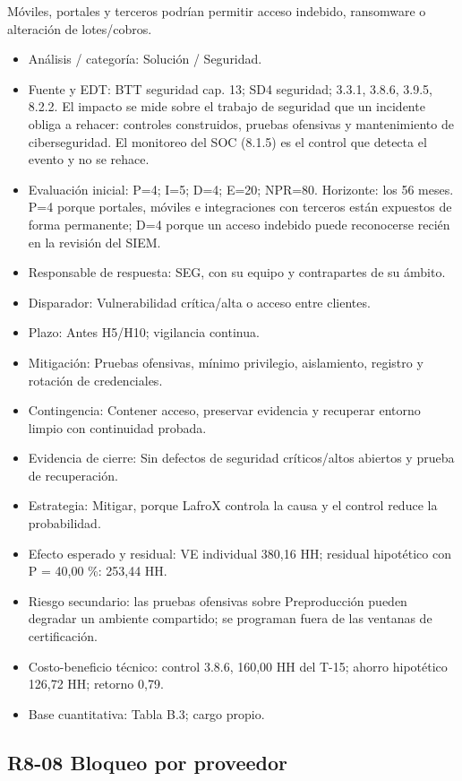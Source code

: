 Móviles, portales y terceros podrían permitir acceso indebido, ransomware o alteración de lotes/cobros.

\begin{itemize}[leftmargin=*,itemsep=3pt]
\item Análisis / categoría: Solución / Seguridad.
\item Fuente y EDT: BTT seguridad cap. 13; SD4 seguridad; 3.3.1, 3.8.6, 3.9.5, 8.2.2. El impacto se mide sobre el trabajo de seguridad que un incidente obliga a rehacer: controles construidos, pruebas ofensivas y mantenimiento de ciberseguridad. El monitoreo del SOC (8.1.5) es el control que detecta el evento y no se rehace.
\item Evaluación inicial: P=4; I=5; D=4; E=20; NPR=80. Horizonte: los 56 meses. P=4 porque portales, móviles e integraciones con terceros están expuestos de forma permanente; D=4 porque un acceso indebido puede reconocerse recién en la revisión del SIEM.
\item Responsable de respuesta: SEG, con su equipo y contrapartes de su ámbito.
\item Disparador: Vulnerabilidad crítica/alta o acceso entre clientes.
\item Plazo: Antes H5/H10; vigilancia continua.
\item Mitigación: Pruebas ofensivas, mínimo privilegio, aislamiento, registro y rotación de credenciales.
\item Contingencia: Contener acceso, preservar evidencia y recuperar entorno limpio con continuidad probada.
\item Evidencia de cierre: Sin defectos de seguridad críticos/altos abiertos y prueba de recuperación.
\item Estrategia: Mitigar, porque LafroX controla la causa y el control reduce la probabilidad.
\item Efecto esperado y residual: VE individual 380,16 HH; residual hipotético con P = 40,00 \%: 253,44 HH.
\item Riesgo secundario: las pruebas ofensivas sobre Preproducción pueden degradar un ambiente compartido; se programan fuera de las ventanas de certificación.
\item Costo-beneficio técnico: control 3.8.6, 160,00 HH del T-15; ahorro hipotético 126,72 HH; retorno 0,79.
\item Base cuantitativa: Tabla B.3; cargo propio.
\end{itemize}

\subsection*{R8-08 \textemdash{} Bloqueo por proveedor}

